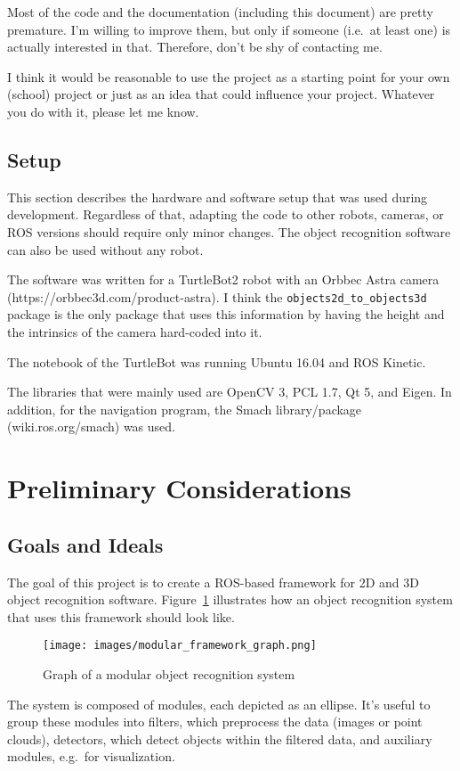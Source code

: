 \documentclass{article}
\newcommand{\code}[1]{\texttt{#1}}
\begin{document}
Most of the code and the documentation (including this document)
are pretty premature.
I'm willing to improve them, but only if someone (i.e.\ at least one)
is actually interested in that. Therefore, don't be shy of contacting me.

I think it would be reasonable to use the project as a starting point
for your own (school) project or just as an idea that could influence
your project.
Whatever you do with it, please let me know.


\subsection{Setup}

This section describes the hardware and software setup that
was used during development.
Regardless of that, adapting the code to other robots,
cameras, or ROS versions should require only minor changes.
The object recognition software can also be used without
any robot.

The software was written for a TurtleBot2 robot with an
Orbbec Astra camera (https://orbbec3d.com/product-astra).
I think the \code{objects2d\_to\_objects3d} package is the
only package that uses this information by having the
height and the intrinsics of the camera hard-coded into
it.

The notebook of the TurtleBot was running Ubuntu 16.04 and
ROS Kinetic.

The libraries that were mainly used are OpenCV 3, PCL 1.7, Qt 5,
and Eigen.
In addition, for the navigation program, the Smach
library/package (wiki.ros.org/smach) was used.


\section{Preliminary Considerations}

\subsection{Goals and Ideals}

The goal of this project is to create a ROS-based framework for
2D and 3D object recognition software.
Figure~\ref{fig:graph_obj_recogn_sys} illustrates how an object recognition
system that uses this framework should look like.
\begin{figure}
	\centering
	\texttt{[image: images/modular\_framework\_graph.png]}
	\caption{Graph of a modular object recognition system}
	\label{fig:graph_obj_recogn_sys}
\end{figure}
The system is composed of modules, each depicted as an ellipse.
It's useful to group these modules into filters, which preprocess the
data (images or point clouds), detectors, which detect objects within
the filtered data, and auxiliary modules, e.g.\ for visualization.
\end{document}
